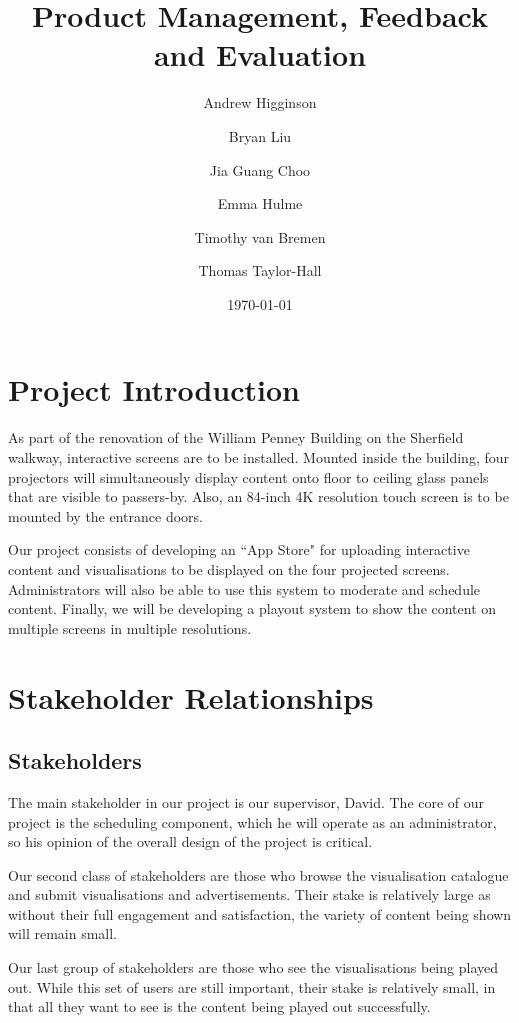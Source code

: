 \documentclass[a4paper]{article}
\begin{document}
\title{Product Management, Feedback and Evaluation}
\author{Andrew Higginson \and Bryan Liu \and Jia Guang Choo \and Emma Hulme \and 
Timothy van Bremen \and Thomas Taylor-Hall}
\date{\today}
\maketitle

\setcounter{table}{0}
\linespread{1.15}

\section{Project Introduction}

As part of the renovation of the William Penney Building on the Sherfield walkway, interactive screens are to be installed. Mounted inside the building, four projectors will simultaneously display content onto floor to ceiling glass panels that are visible to passers-by. Also, an 84-inch 4K resolution touch screen is to be mounted by the entrance doors. 

Our project consists of developing an ``App Store" for uploading interactive content and visualisations to be displayed on the four projected screens. Administrators will also be able to use this system to moderate and schedule content. Finally, we will be developing a playout system to show the content on multiple screens in multiple resolutions.

\section{Stakeholder Relationships}

\subsection{Stakeholders}

The main stakeholder in our project is our supervisor, David. The core of our project is the scheduling component, which he will operate as an administrator, so his opinion of the overall design of the project is critical.

Our second class of stakeholders are those who browse the visualisation catalogue and submit visualisations and advertisements. Their stake is relatively large as without their full engagement and satisfaction, the variety of content being shown will remain small. 

Our last group of stakeholders are those who see the visualisations being played out. While this set of users are still important, their stake is relatively small, in that all they want to see is the content being played out successfully.
\end{document}
